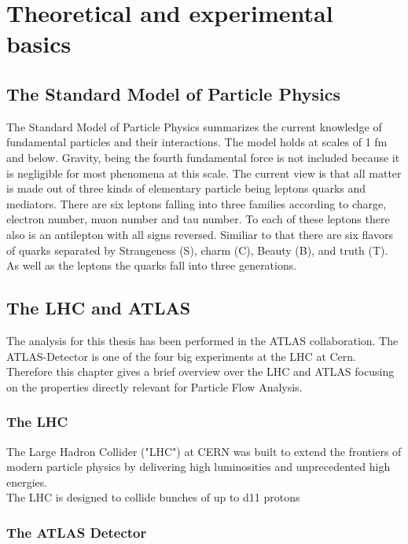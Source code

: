 \chapter{Theoretical and experimental basics}
\label{theory}

\section{The Standard Model of Particle Physics}

The Standard Model of Particle Physics summarizes the current knowledge of fundamental particles and their interactions. The model holds at scales of 1 fm and below. Gravity, being the fourth fundamental force is not included because it is negligible for most phenomena at this scale.
The current view is that all matter is made out of three kinds of elementary particle being leptons quarks and mediators.
There are six leptons falling into three families according to charge, electron number, muon number and tau number. To each of these leptons there also is an antilepton with all signs reversed.
Similiar to that there are six flavors of quarks separated by Strangeness (S), charm (C), Beauty (B), and truth (T). As well as the leptons the quarks fall into three generations.





\section{The LHC and ATLAS}

The analysis for this thesis has been performed in the ATLAS collaboration. The ATLAS-Detector is one of the four big experiments at the LHC at Cern. Therefore this chapter gives a brief overview over the LHC and ATLAS focusing on the properties directly relevant for Particle Flow Analysis.

\subsection{The LHC}

The Large Hadron Collider ("LHC") at CERN was built to extend the frontiers of modern particle physics by delivering high luminosities and unprecedented high energies.\\
The LHC is designed to collide bunches of up to \num{d11} protons

\subsection{The ATLAS Detector}


